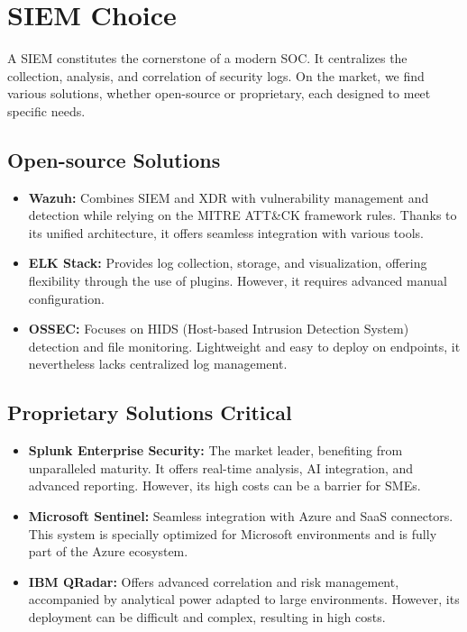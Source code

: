 \section{SIEM Choice}
\label{sec:siem}

A SIEM constitutes the cornerstone of a modern SOC. It centralizes the collection, analysis, and correlation of security logs. On the market, we find various solutions, whether open-source or proprietary, each designed to meet specific needs.

\subsection{Open-source Solutions}
\label{subsec:siem-open}

\begin{itemize}
    \item \textbf{Wazuh:} Combines SIEM and XDR with vulnerability management and detection while relying on the MITRE ATT\&CK framework rules. Thanks to its unified architecture, it offers seamless integration with various tools.
    \item \textbf{ELK Stack:} Provides log collection, storage, and visualization, offering flexibility through the use of plugins. However, it requires advanced manual configuration.
    \item \textbf{OSSEC:} Focuses on HIDS (Host-based Intrusion Detection System) detection and file monitoring. Lightweight and easy to deploy on endpoints, it nevertheless lacks centralized log management.
\end{itemize}

\subsection{Proprietary Solutions Critical}
\label{subsec:siem-proprietary}

\begin{itemize}
    \item \textbf{Splunk Enterprise Security:} The market leader, benefiting from unparalleled maturity. It offers real-time analysis, AI integration, and advanced reporting. However, its high costs can be a barrier for SMEs.
    \item \textbf{Microsoft Sentinel:} Seamless integration with Azure and SaaS connectors. This system is specially optimized for Microsoft environments and is fully part of the Azure ecosystem.
    \item \textbf{IBM QRadar:} Offers advanced correlation and risk management, accompanied by analytical power adapted to large environments. However, its deployment can be difficult and complex, resulting in high costs.
\end{itemize}

